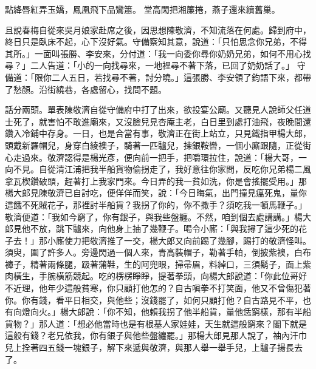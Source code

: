 點絳唇紅弄玉嬌，鳳凰飛下品鸞簫。
堂高閑把湘簾捲，燕子還來續舊巢。

且說春梅自從來吳月娘家赴席之後，因思想陳敬濟，不知流落在何處。歸到府中，終日只是臥床不起，心下沒好氣。守備察知其意，說道：「只怕思念你兄弟，不得其所。」一面叫張勝、李安來，分付道：「我一向委你尋你奶奶兄弟，如何不用心找尋？」二人告道：「小的一向找尋來，一地裡尋不著下落，已回了奶奶話了。」 守備道：「限你二人五日，若找尋不著，討分曉。」這張勝、李安領了鈞語下來，都帶了愁顏。沿街繞巷，各處留心，找問不題。

話分兩頭。單表陳敬濟自從守備府中打了出來，欲投宴公廟。又聽見人說師父任道士死了，就害怕不敢進廟來，又沒臉兒見杏庵主老，白日里到處打油飛，夜晚間還鑽入冷鋪中存身。一日，也是合當有事，敬濟正在街上站立，只見鐵指甲楊大郎，頭戴新羅帽兒，身穿白綾襖子，騎著一匹驢兒，揀銀鞍轡，一個小廝跟隨，正從街心走過來。敬濟認得是楊光彥，便向前一把手，把嚼環拉住，說道：「楊大哥，一向不見。自從清江浦把我半船貨物偷拐走了，我好意往你家問，反吃你兄弟楊二風拿瓦楔鑽破頭，趕著打上我家門來。今日弄的我一貧如洗，你是會搖擺受用。」那楊大郎見陳敬濟已自討吃，便佯佯而笑，說：「今日晦氣，出門撞見瘟死鬼，量你這餓不死賊花子，那裡討半船貨？我拐了你的，你不撒手？須吃我一頓馬鞭子。」敬濟便道：「我如今窮了，你有銀子，與我些盤纏。不然，咱到個去處講講。」楊大郎見他不放，跳下驢來，向他身上抽了幾鞭子。喝令小廝：「與我撏了這少死的花子去！」那小廝使力把敬濟推了一交，楊大郎又向前踢了幾腳，踢打的敬濟怪叫。須臾，圍了許多人。旁邊閃過一個人來，青高裝帽子，勒著手帕，倒披紫襖，白布褲子，精著兩條腿，趿著蒲鞋，生的阿兜眼，掃帚眉，料綽口，三須鬍子，面上紫肉橫生，手腕橫筋競起。吃的楞楞睜睜，提著拳頭，向楊大郎說道：「你此位哥好不近理，他年少這般貧寒，你只顧打他怎的？自古嗔拳不打笑面，他又不曾傷犯著你。你有錢，看平日相交，與他些；沒錢罷了，如何只顧打他？自古路見不平，也有向燈向火。」楊大郎說：「你不知，他賴我拐了他半船貨，量他恁窮樣，那有半船貨物？」那人道：「想必他當時也是有根基人家娃娃，天生就這般窮來？閣下就是這般有錢？老兄依我，你有銀子與他些盤纏罷。」那楊大郎見那人說了，袖內汗巾兒上拴著四五錢一塊銀子，解下來遞與敬濟，與那人舉一舉手兒，上驢子揚長去了。


